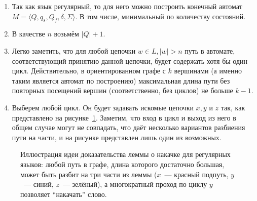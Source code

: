 \begin{proofSketch}
    \begin{enumerate}
        \item Так как язык регулярный, то для него можно построить конечный автомат $M = \langle Q, q_s,Q_f, \delta, \Sigma \rangle$.
              В том числе, минимальный по количеству состояний.
        \item В качестве $n$ возьмём $|Q| + 1$.
        \item Легко заметить, что для любой цепочки $w \in L, |w| > n$ путь в автомате, соответствующий принятию данной цепочки, будет содержать хотя бы один цикл.
              Действительно, в ориентированном графе с $k$ вершинами (а именно таким является автомат по построению) максимальная длина пути без повторных посещений вершин (соответственно, без циклов) не больше $k - 1$.
        \item Выберем любой цикл. Он будет задавать искомые цепочки $x, y$ и $z$ так, как представлено на рисунке~\ref{fig:reg_lang_pumping_lemma}.
              Заметим, что вход в цикл и выход из него в общем случае могут не совпадать, что даёт несколько вариантов разбиения пути на части, и на рисунке представлен лишь один из возможных.
              \qedhere
    \end{enumerate}
\end{proofSketch}

\begin{figure}
    \caption{Иллюстрация идеи доказательства леммы о накачке для регулярных языков: любой путь в графе, длина которого достаточно большая, может быть разбит на три части из леммы ($x$~--- красный подпуть, $y$~--- синий, $z$~--- зелёный), а многократный проход по циклу $y$ позволяет \enquote{накачать} слово.}
    \label{fig:reg_lang_pumping_lemma}
    \begin{center}
    \end{center}

\end{figure}



